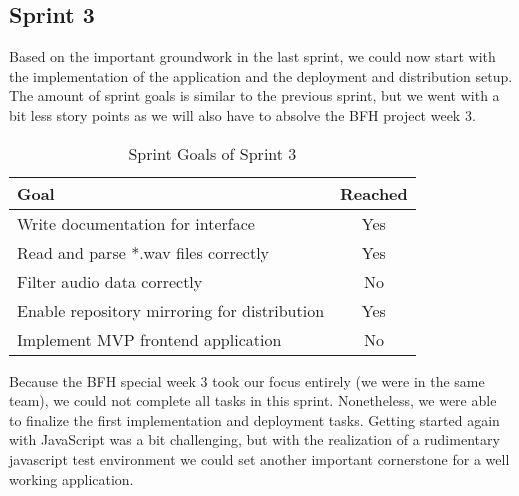 \subsection{Sprint 3}\label{subsec:sprint-3}
Based on the important groundwork in the last sprint, we could now start with the implementation of the application
and the deployment and distribution setup.
The amount of sprint goals is similar to the previous sprint, but we went with a bit less story points as we will also
have to absolve the BFH project week 3.
\begin{table}[H]
    \centering
    \begin{tabularx}{\textwidth}{X c}
        \toprule
        \textbf{Goal}                                         & \textbf{Reached} \\
        \midrule
        Write documentation for interface                     & Yes              \\
        \midrule
        Read and parse *.wav files correctly                  & Yes              \\
        \midrule
        Filter audio data correctly                           & No               \\
        \midrule
        Enable repository mirroring for distribution          & Yes              \\
        \midrule
        Implement MVP frontend application                    & No               \\
        \bottomrule
    \end{tabularx}
    \caption{Sprint Goals of Sprint 3}\label{tab:sprint_goals3}
\end{table}
Because the BFH special week 3 took our focus entirely (we were in the same team),
we could not complete all tasks in this sprint.
Nonetheless, we were able to finalize the first implementation and deployment tasks.
Getting started again with JavaScript was a bit challenging,
but with the realization of a rudimentary javascript test environment we could set another important cornerstone for
a well working application.

